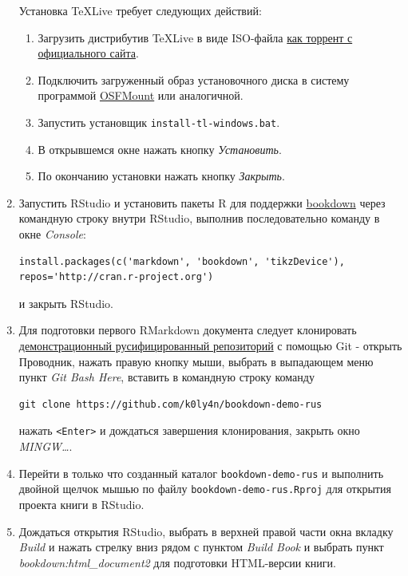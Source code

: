 \documentclass[
  a4paper,
]{book}
\providecommand{\tightlist}{%
  \setlength{\itemsep}{0pt}\setlength{\parskip}{0pt}}
\theoremstyle{definition}
\theoremstyle{definition}
\theoremstyle{definition}
\theoremstyle{definition}
\theoremstyle{remark}
\begin{document}
\begin{enumerate}
  Установка TeXLive требует следующих действий:

  \begin{enumerate}
  \def\labelenumii{\arabic{enumii}.}
  \tightlist
  \item
    Загрузить дистрибутив TeXLive в виде ISO-файла \href{https://www.tug.org/texlive/acquire-iso.html\#torrent}{как торрент с официального сайта}.
  \item
    Подключить загруженный образ установочного диска в систему программой \href{https://www.osforensics.com/tools/mount-disk-images.html}{OSFMount} или аналогичной.
  \item
    Запустить установщик \texttt{install-tl-windows.bat}.
  \item
    В открывшемся окне нажать кнопку \emph{Установить}.
  \item
    По окончанию установки нажать кнопку \emph{Закрыть}.
  \end{enumerate}
\item
  Запустить RStudio и установить пакеты R для поддержки \href{https://bookdown.org/home/getting-started.html}{bookdown} через командную строку внутри RStudio, выполнив последовательно команду в окне \emph{Console}:

\begin{verbatim}
install.packages(c('markdown', 'bookdown', 'tikzDevice'), repos='http://cran.r-project.org')
\end{verbatim}

  и закрыть RStudio.
\item
  Для подготовки первого RMarkdown документа следует клонировать \href{https://github.com/k0ly4n/bookdown-demo-rus}{демонстрационный русифицированный репозиторий} с помощью Git - открыть Проводник, нажать правую кнопку мыши, выбрать в выпадающем меню пункт \emph{Git Bash Here}, вставить в командную строку команду

\begin{verbatim}
git clone https://github.com/k0ly4n/bookdown-demo-rus
\end{verbatim}

  нажать \texttt{\textless{}Enter\textgreater{}} и дождаться завершения клонирования, закрыть окно \emph{MINGW\ldots{}}.
\item
  Перейти в только что созданный каталог \texttt{bookdown-demo-rus} и выполнить двойной щелчок мышью по файлу \texttt{bookdown-demo-rus.Rproj} для открытия проекта книги в RStudio.
\item
  Дождаться открытия RStudio, выбрать в верхней правой части окна вкладку \emph{Build} и нажать стрелку вниз рядом с пунктом \emph{Build Book} и выбрать пункт \emph{bookdown:html\_document2} для подготовки HTML-версии книги.


\end{enumerate}
\end{document}
